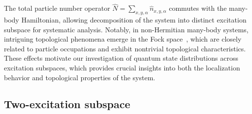 \documentclass[longbibliography, aps, prx, amsmath, amssymb, amsfonts, twocolumn,superscriptaddress, footinbib]{revtex4-1}
\begin{document}


	The total particle number operator $\hat{N} = \sum_{x,y,\alpha} \hat{n}_{x,y,\alpha}$ commutes with the many-body Hamiltonian, 
	allowing decomposition of the system into distinct excitation subspace for systematic analysis. 
	Notably, in non-Hermitian many-body systems, intriguing topological phenomena emerge in the Fock space~\cite{shen2024enhanced,shimomura2024general,deng2022observing}, which are closely related to particle occupations and exhibit nontrivial topological characteristics. 
	These effects motivate our investigation of quantum state distributions across excitation subspaces, which provides crucial insights into both the localization behavior and topological properties of the system.



	\subsection{Two-excitation subspace}
\end{document}

